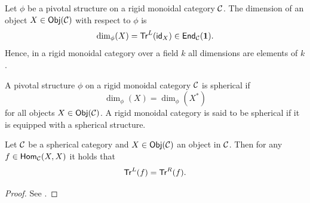 	\begin{defn}[Dimension]
		\label{def:ctdim}
		Let $\phi$ be a pivotal structure on a rigid monoidal category ${\mathcal{C}}$. The dimension of an object $X\in\mathsf{Obj}({\mathcal{C}})$ with respect to $\phi$ is 
			\begin{equation}
				\dim_\phi(X)=\mathsf{Tr}^L(\mathsf{id}_X)\in\mathsf{End}_{\mathcal{C}}(\mathbf{1}).
			\end{equation}
		Hence, in a rigid monoidal category over a field $k$ all dimensions are elements of $k$.
	\end{defn}

	\begin{defn}[Spherical]
		\label{def:sph}
		A pivotal structure $\phi$ on a rigid monoidal category ${\mathcal{C}}$ is spherical if 
			\begin{equation}
				\dim_\phi(X)=\dim_\phi(X^*)
			\end{equation}
		for all objects $X\in\mathsf{Obj}({\mathcal{C}})$. A rigid monoidal category is said to be spherical if it is equipped with a spherical structure.
	\end{defn}

	\begin{thm}
		Let ${\mathcal{C}}$ be a spherical category and $X\in\mathsf{Obj}({\mathcal{C}})$ an object in ${\mathcal{C}}$. Then for any $f\in\mathsf{Hom}_{\mathcal{C}}(X,X)$ it holds that	
			\begin{equation}
				\mathsf{Tr}^L(f)=\mathsf{Tr}^R (f).
			\end{equation}
	\end{thm}

	\begin{proof}
		See \cite[Theorem 4.7.15]{Etingof2015}.
	\end{proof}

